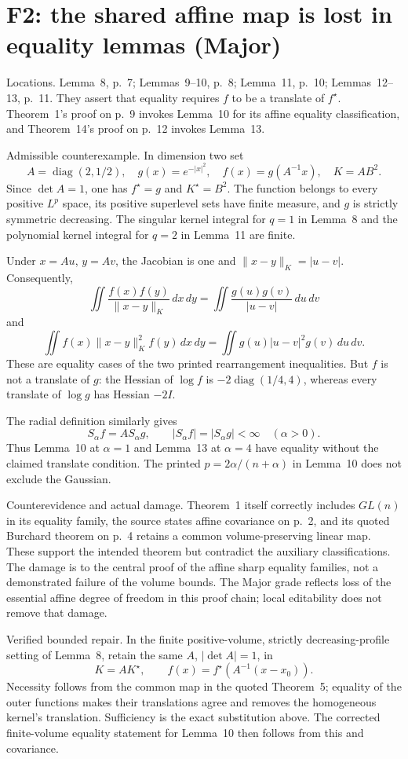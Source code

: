 \documentclass[10pt]{article}
\begin{document}
\section*{F2: the shared affine map is lost in equality lemmas (Major)}
Locations. Lemma 8, p. 7; Lemmas 9–10, p. 8; Lemma 11, p. 10; Lemmas 12–13, p. 11. They assert that equality requires \(f\) to be a translate of \(f^\star\). Theorem 1’s proof on p. 9 invokes Lemma 10 for its affine equality classification, and Theorem 14’s proof on p. 12 invokes Lemma 13.\par
Admissible counterexample. In dimension two set \[A=\operatorname{diag}(2,1/2),\quad g(x)=e^{-|x|^2},
 \quad f(x)=g(A^{-1}x),\quad K=AB^2.\] Since \(\det A=1\), one has \(f^\star=g\) and \(K^\star=B^2\). The function belongs to every positive \(L^p\) space, its positive superlevel sets have finite measure, and \(g\) is strictly symmetric decreasing. The singular kernel integral for \(q=1\) in Lemma 8 and the polynomial kernel integral for \(q=2\) in Lemma 11 are finite.\par
Under \(x=Au\), \(y=Av\), the Jacobian is one and \(\|x-y\|_K=|u-v|\). Consequently, \[\iint\frac{f(x)f(y)}{\|x-y\|_K}\,dx\,dy
 =\iint\frac{g(u)g(v)}{|u-v|}\,du\,dv\] and \[\iint f(x)\|x-y\|_K^2f(y)\,dx\,dy
 =\iint g(u)|u-v|^2g(v)\,du\,dv.\] These are equality cases of the two printed rearrangement inequalities. But \(f\) is not a translate of \(g\): the Hessian of \(\log f\) is \(-2\operatorname{diag}(1/4,4)\), whereas every translate of \(\log g\) has Hessian \(-2I\).\par
The radial definition similarly gives \[S_\alpha f=A S_\alpha g,\qquad |S_\alpha f|=|S_\alpha g|<\infty
 \quad(\alpha>0).\] Thus Lemma 10 at \(\alpha=1\) and Lemma 13 at \(\alpha=4\) have equality without the claimed translate condition. The printed \(p=2\alpha/(n+\alpha)\) in Lemma 10 does not exclude the Gaussian.\par
Counterevidence and actual damage. Theorem 1 itself correctly includes \(GL(n)\) in its equality family, the source states affine covariance on p. 2, and its quoted Burchard theorem on p. 4 retains a common volume-preserving linear map. These support the intended theorem but contradict the auxiliary classifications. The damage is to the central proof of the affine sharp equality families, not a demonstrated failure of the volume bounds. The Major grade reflects loss of the essential affine degree of freedom in this proof chain; local editability does not remove that damage.\par
Verified bounded repair. In the finite positive-volume, strictly decreasing-profile setting of Lemma 8, retain the same \(A\), \(|\det A|=1\), in \[K=AK^\star,\qquad f(x)=f^\star(A^{-1}(x-x_0)).\] Necessity follows from the common map in the quoted Theorem 5; equality of the outer functions makes their translations agree and removes the homogeneous kernel’s translation. Sufficiency is the exact substitution above. The corrected finite-volume equality statement for Lemma 10 then follows from this and covariance.\par
\end{document}
